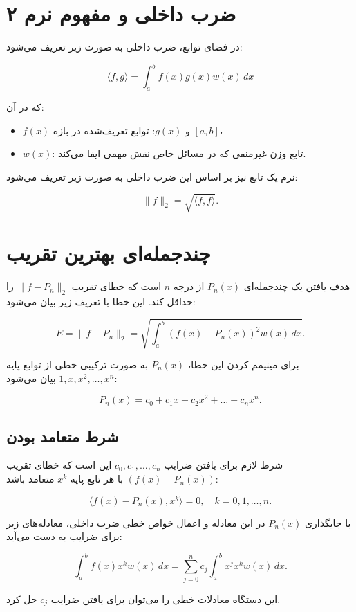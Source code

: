\section{ضرب داخلی و مفهوم نرم ۲}

در فضای توابع، ضرب داخلی به صورت زیر تعریف می‌شود:

\[
\langle f, g \rangle = \int_a^b f(x) g(x) w(x) \, dx
\]

که در آن:
\begin{itemize}
	\item \(f(x)\) و \(g(x)\): توابع تعریف‌شده در بازه \([a, b]\)،
	\item \(w(x)\): تابع وزن غیرمنفی که در مسائل خاص نقش مهمی ایفا می‌کند.
\end{itemize}

نرم یک تابع نیز بر اساس این ضرب داخلی به صورت زیر تعریف می‌شود:

\[
\|f\|_2 = \sqrt{\langle f, f \rangle}.
\]

\section{چندجمله‌ای بهترین تقریب}

هدف یافتن یک چندجمله‌ای \(P_n(x)\) از درجه \(n\) است که خطای تقریب \(\|f - P_n\|_2\) را حداقل کند. این خطا با تعریف زیر بیان می‌شود:

\[
E = \|f - P_n\|_2 = \sqrt{\int_a^b \left(f(x) - P_n(x)\right)^2 w(x) \, dx}.
\]

برای مینیمم کردن این خطا، \(P_n(x)\) به صورت ترکیبی خطی از توابع پایه \(1, x, x^2, \dots, x^n\) بیان می‌شود:

\[
P_n(x) = c_0 + c_1x + c_2x^2 + \dots + c_nx^n.
\]

\subsection{شرط متعامد بودن}

شرط لازم برای یافتن ضرایب \(c_0, c_1, \dots, c_n\) این است که خطای تقریب \((f(x) - P_n(x))\) با هر تابع پایه \(x^k\) متعامد باشد:

\[
\langle f(x) - P_n(x), x^k \rangle = 0, \quad k = 0, 1, \dots, n.
\]

با جایگذاری \(P_n(x)\) در این معادله و اعمال خواص خطی ضرب داخلی، معادله‌های زیر برای ضرایب به دست می‌آید:

\[
\int_a^b f(x) x^k w(x) \, dx = \sum_{j=0}^n c_j \int_a^b x^j x^k w(x) \, dx.
\]

این دستگاه معادلات خطی را می‌توان برای یافتن ضرایب \(c_j\) حل کرد.

